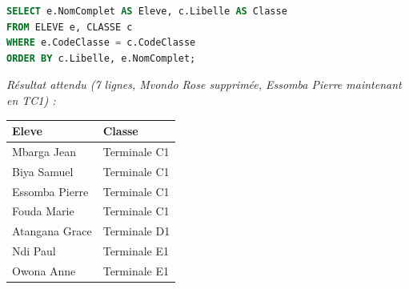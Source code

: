 \documentclass[11pt]{article}
\begin{document}
\begin{exoresolu}
\begin{lstlisting}[language=SQL]
SELECT e.NomComplet AS Eleve, c.Libelle AS Classe
FROM ELEVE e, CLASSE c
WHERE e.CodeClasse = c.CodeClasse
ORDER BY c.Libelle, e.NomComplet;
\end{lstlisting}
\emph{Résultat attendu (7 lignes, Mvondo Rose supprimée, Essomba Pierre maintenant en TC1) :}
\begin{center}
\begin{tabular}{|l|l|}
\hline
\textbf{Eleve} & \textbf{Classe} \\
\hline
Mbarga Jean & Terminale C1 \\
Biya Samuel & Terminale C1 \\
Essomba Pierre & Terminale C1 \\
Fouda Marie & Terminale C1 \\
Atangana Grace & Terminale D1 \\
Ndi Paul & Terminale E1 \\
Owona Anne & Terminale E1 \\
\hline
\end{tabular}
\end{center}


\end{exoresolu}
\end{document}
